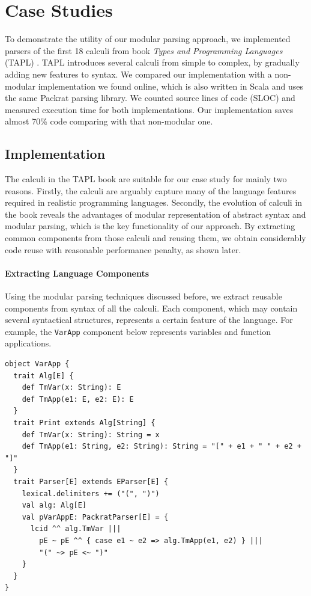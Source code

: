 \section{Case Studies}\label{sec:casestudy}


To demonstrate the utility of our modular parsing approach, we
implemented parsers of the first 18 calculi from book \textit{Types
  and Programming Languages} (TAPL) \cite{pierce2002types}. TAPL introduces several
calculi from simple to complex, by gradually adding new features to
syntax. We compared our implementation with a non-modular implementation
we found online, which is also written in Scala and uses the same Packrat parsing library.
We counted source lines of code (SLOC) and measured execution time for both implementations.
Our implementation saves almost 70\% code comparing with that non-modular one.


\subsection{Implementation}\label{subsec:implementation}

The calculi in the TAPL book are suitable for our case study for mainly two reasons.
Firstly, the calculi are arguably capture many of the language features
required in realistic programming languages. Secondly, the evolution of
calculi in the book reveals the advantages of modular representation
of abstract syntax and modular parsing, which is the key functionality
of our approach. By extracting common components from those calculi
and reusing them, we obtain considerably code reuse with reasonable performance penalty, as shown later.

\paragraph{Extracting Language Components}
Using the modular parsing techniques discussed before, we extract
reusable components from syntax of all the calculi. Each
component, which may contain several syntactical structures,
represents a certain feature of the language. For
example, the \lstinline{VarApp} component below represents variables and
function applications.

\begin{lstlisting}
object VarApp {
  trait Alg[E] {
    def TmVar(x: String): E
    def TmApp(e1: E, e2: E): E
  }
  trait Print extends Alg[String] {
    def TmVar(x: String): String = x
    def TmApp(e1: String, e2: String): String = "[" + e1 + " " + e2 + "]"
  }
  trait Parser[E] extends EParser[E] {
    lexical.delimiters += ("(", ")")
    val alg: Alg[E]
    val pVarAppE: PackratParser[E] = {
      lcid ^^ alg.TmVar |||
        pE ~ pE ^^ { case e1 ~ e2 => alg.TmApp(e1, e2) } |||
        "(" ~> pE <~ ")"
    }
  }
}
\end{lstlisting}


